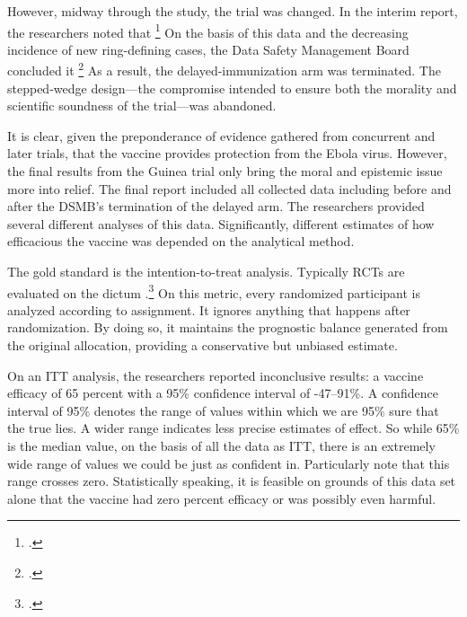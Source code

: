 \documentclass[letterpaper,notitlepage,12pt]{article}
\begin{document}
However, midway through the study, the trial was changed.
In the interim report, 
the researchers noted that \footcite[p. 857]{HR2015}
On the basis of this data and the decreasing incidence of new ring-defining
cases, the Data Safety Management Board concluded it
\footcite{UF} 
As a result, the delayed-immunization arm was terminated.
The stepped-wedge design---the compromise intended to ensure both the morality
and scientific soundness of the trial---was abandoned.

It is clear, given the preponderance of evidence gathered from
concurrent and later trials, that the vaccine provides protection
from the Ebola virus.
However, the final results from the Guinea trial only bring the moral and
epistemic issue more into relief.
The final report included all collected data including before and after the 
DSMB's termination of the delayed arm.
The researchers provided several different analyses of this data.
Significantly, different estimates of how efficacious the vaccine was depended on
the analytical method.

The gold standard is the intention-to-treat analysis.
Typically RCTs are evaluated on the dictum .\footcite{hennekens1987}
On this metric, every randomized participant is analyzed according to
assignment.
It ignores anything that happens after randomization.
By doing so, it maintains the prognostic balance generated from the original
allocation, providing a conservative but unbiased estimate.

On an ITT analysis, the researchers reported inconclusive results: a vaccine
efficacy of 65 percent with a 95\% confidence interval of -47--91\%.
A confidence interval of 95\% denotes the range of values within which we are
95\% sure that the true lies.
A wider range indicates less precise estimates of effect.
So while 65\% is the median value, on the basis of all the data as ITT, there 
is an extremely wide range of values we could be just as confident in.
Particularly note that this range crosses zero.
Statistically speaking, it is feasible on grounds of this data set alone that
the vaccine had zero percent efficacy or was possibly even harmful.
\end{document}
